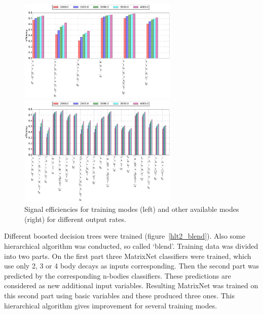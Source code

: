 \documentclass[a4paper]{jpconf}
\begin{document}
\begin{figure}[h]
\begin{minipage}{18pc}
\includegraphics[width=18pc]{../images/rates_small}
\end{minipage}\hspace{2pc}%
\begin{minipage}{18pc}
\includegraphics[width=18pc]{../images/rates}
\end{minipage} 
\caption{\label{hlt2_out} Signal efficiencies for training modes (left) and other available modes (right) for different output rates.}
\end{figure}

Different boosted decision trees were trained (figure~\ref{hlt2_blend}). Also some hierarchical algorithm was conducted, so called `blend'. Training data was divided into two parts. On the first part three MatrixNet classifiers were trained, which use only 2, 3 or 4 body decays as inputs corresponding. Then the second part was predicted by the corresponding n-bodies classifiers. These predictions are considered as new additional input variables. Resulting MatrixNet was trained on this second part using basic variables and these produced three ones. This hierarchical algorithm gives improvement for several training modes.
\end{document}
